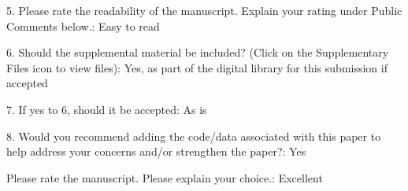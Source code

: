 \documentclass[10pt]{article}
\begin{document}
\begin{spverbatim}
5. Please rate the readability of the manuscript. Explain your rating under Public Comments below.: Easy to read

6. Should the supplemental material be included? (Click on the Supplementary Files icon to view files): Yes, as part of the digital library for this submission if accepted

7. If yes to 6, should it be accepted: As is

8. Would you recommend adding the code/data associated with this paper to help address your concerns and/or strengthen the paper?: Yes

Please rate the manuscript. Please explain your choice.: Excellent
\end{spverbatim}
\end{document}
